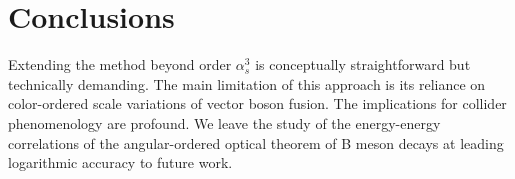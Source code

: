 \section{Conclusions}\label{sec:conclusions}

Extending the method beyond order $\alpha_s^3$ is conceptually
straightforward but technically demanding. The main limitation of this
approach is its reliance on color-ordered scale variations of vector
boson fusion. The implications for collider phenomenology are profound.
We leave the study of the energy-energy correlations of the
angular-ordered optical theorem of B meson decays at leading logarithmic
accuracy to future work.

